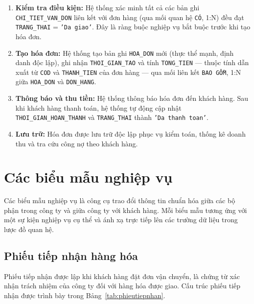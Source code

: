 \documentclass[11pt]{report}
\begin{document}
\begin{enumerate}
    \item \textbf{Kiểm tra điều kiện:} Hệ thống xác minh tất cả các bản ghi \texttt{CHI\_TIET\_VAN\_DON} liên kết với đơn hàng (qua mối quan hệ \texttt{CÓ}, 1:N) đều đạt \texttt{TRANG\_THAI} = \texttt{'Da giao'}. Đây là ràng buộc nghiệp vụ bắt buộc trước khi tạo hóa đơn.

    \item \textbf{Tạo hóa đơn:} Hệ thống tạo bản ghi \texttt{HOA\_DON} mới (thực thể mạnh, định danh độc lập), ghi nhận \texttt{THOI\_GIAN\_TAO} và tính \texttt{TONG\_TIEN} --- thuộc tính dẫn xuất từ \texttt{COD} và \texttt{THANH\_TIEN} của đơn hàng --- qua mối liên kết \texttt{BAO GỒM}, 1:N giữa \texttt{HOA\_DON} và \texttt{DON\_HANG}.

    \item \textbf{Thông báo và thu tiền:} Hệ thống thông báo hóa đơn đến khách hàng. Sau khi khách hàng thanh toán, hệ thống tự động cập nhật \texttt{THOI\_GIAN\_HOAN\_THANH} và \texttt{TRANG\_THAI} thành \texttt{'Da thanh toan'}.

    \item \textbf{Lưu trữ:} Hóa đơn được lưu trữ độc lập phục vụ kiểm toán, thống kê doanh thu và tra cứu công nợ theo khách hàng.
\end{enumerate}


\section{Các biểu mẫu nghiệp vụ}
\label{sec:bieumau}

Các biểu mẫu nghiệp vụ là công cụ trao đổi thông tin chuẩn hóa giữa các bộ phận trong công ty và giữa công ty với khách hàng. Mỗi biểu mẫu tương ứng với một sự kiện nghiệp vụ cụ thể và ánh xạ trực tiếp lên các trường dữ liệu trong lược đồ quan hệ.

\subsection{Phiếu tiếp nhận hàng hóa}
\label{subsec:phieutiepnhan}

Phiếu tiếp nhận được lập khi khách hàng đặt đơn vận chuyển, là chứng từ xác nhận trách nhiệm của công ty đối với hàng hóa được giao. Cấu trúc phiếu tiếp nhận được trình bày trong Bảng~\ref{tab:phieutiepnhan}.
\end{document}
